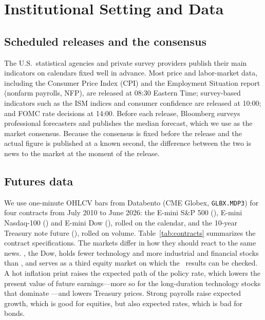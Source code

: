 \section{Institutional Setting and Data}\label{sec:data}

\subsection{Scheduled releases and the consensus}

The U.S.\ statistical agencies and private survey providers publish their main indicators on
calendars fixed well in advance. Most price and labor-market data, including the Consumer Price
Index (CPI) and the Employment Situation report (nonfarm payrolls, NFP), are released at 08:30
Eastern Time; survey-based indicators such as the ISM indices and consumer confidence are released
at 10:00; and FOMC rate decisions at 14:00. Before each release, Bloomberg surveys professional
forecasters and publishes the median forecast, which we use as the market consensus. Because the
consensus is fixed before the release and the actual figure is published at a known second, the
difference between the two is news to the market at the moment of the release.

\subsection{Futures data}

We use one-minute OHLCV bars from Databento (CME Globex, \texttt{GLBX.MDP3}) for four contracts
from July 2010 to June 2026: the E-mini S\&P 500 (\ES), E-mini Nasdaq-100 (\NQ) and E-mini Dow (\YM),
rolled on the calendar, and the 10-year Treasury note future (\ZN), rolled on volume. Table~\ref{tab:contracts}
summarizes the contract specifications. The markets differ in how they should react to the
same news. \YM, the Dow, holds fewer technology and more industrial and financial stocks than
\ES, and serves as a third equity market on which the \ES\ results can be checked. A hot inflation print raises the expected path of the policy rate, which lowers the
present value of future earnings---more so for the long-duration technology stocks that dominate
\NQ---and lowers Treasury prices. Strong payrolls raise expected growth, which is good for
equities, but also expected rates, which is bad for bonds.

